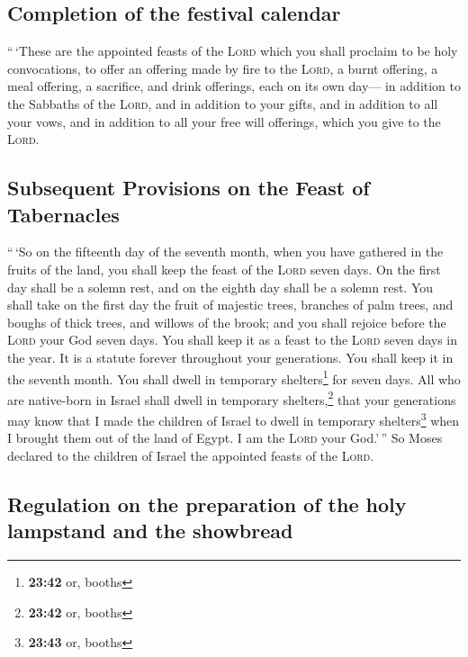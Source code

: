 \hypertarget{completion-of-the-festival-calendar}{%
\subsection{Completion of the festival
calendar}\label{completion-of-the-festival-calendar}}

 ``\,`These are the appointed feasts of the \textsc{Lord}
which you shall proclaim to be holy convocations, to offer an offering
made by fire to the \textsc{Lord}, a burnt offering, a meal offering, a
sacrifice, and drink offerings, each on its own day--- 
in addition to the Sabbaths of the \textsc{Lord}, and in addition to
your gifts, and in addition to all your vows, and in addition to all
your free will offerings, which you give to the \textsc{Lord}.

\hypertarget{subsequent-provisions-on-the-feast-of-tabernacles}{%
\subsection{Subsequent Provisions on the Feast of
Tabernacles}\label{subsequent-provisions-on-the-feast-of-tabernacles}}

 ``\,`So on the fifteenth day of the seventh month, when
you have gathered in the fruits of the land, you shall keep the feast of
the \textsc{Lord} seven days. On the first day shall be a solemn rest,
and on the eighth day shall be a solemn rest.  You shall
take on the first day the fruit of majestic trees, branches of palm
trees, and boughs of thick trees, and willows of the brook; and you
shall rejoice before the \textsc{Lord} your God seven days.
 You shall keep it as a feast to the \textsc{Lord} seven
days in the year. It is a statute forever throughout your generations.
You shall keep it in the seventh month.  You shall dwell
in temporary shelters\footnote{\textbf{23:42} or, booths} for seven
days. All who are native-born in Israel shall dwell in temporary
shelters,\footnote{\textbf{23:42} or, booths}  that your
generations may know that I made the children of Israel to dwell in
temporary shelters\footnote{\textbf{23:43} or, booths} when I brought
them out of the land of Egypt. I am the \textsc{Lord} your God.'\,''
 So Moses declared to the children of Israel the
appointed feasts of the \textsc{Lord}.

\hypertarget{regulation-on-the-preparation-of-the-holy-lampstand-and-the-showbread}{%
\subsection{Regulation on the preparation of the holy lampstand and the
showbread}\label{regulation-on-the-preparation-of-the-holy-lampstand-and-the-showbread}}

